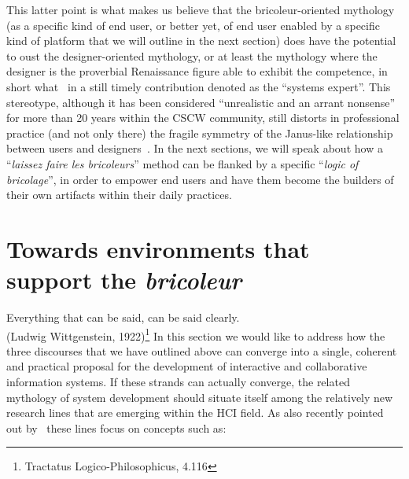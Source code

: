 \documentclass{article}
\let\origquotation\quotation
\let\endorigquotation\endquotation
\renewenvironment{quotation}{\vspace{-0.5\parskip}
  \origquotation
  \footnotesize
}{\endorigquotation}
\begin{document}
This latter point is what makes us believe that the bricoleur-oriented mythology (as a specific kind of end user, or better yet, of end user enabled by a specific kind of platform that we will outline in the next section) does have the potential to oust the designer-oriented mythology, or at least the mythology where the designer is the proverbial Renaissance figure able to exhibit the competence, in short what~\citet{hirschheim_four_1989} in a still timely contribution denoted as the ``systems expert''. This stereotype, although it has been considered ``unrealistic and an arrant nonsense'' for more than 20 years within the CSCW community, still distorts in professional practice (and not only there) the fragile symmetry of the Janus-like relationship between users and designers~\citep{bowers_janus_1991}. In the next sections, we will speak about how a ``\emph{laissez faire les bricoleurs}'' method can be flanked by a specific ``\emph{logic of bricolage}'', in order to empower end users and have them become the builders of their own artifacts within their daily practices. 










\section{Towards environments that support the \emph{bricoleur}}
\label{sec:environments}
\begin{quotation}
Everything that can be said, can be said clearly.\\
(Ludwig Wittgenstein, 1922)\footnote{Tractatus Logico-Philosophicus, 4.116}
\end{quotation}
In this section we would like to address how the three discourses that we have outlined above can converge into a single, coherent and practical proposal for the development of interactive and collaborative information systems. If these strands can actually converge, the related mythology of system development should situate itself among the relatively new research lines that are emerging within the HCI field. As also recently pointed out by~\citet{ardito_composition_2012} these lines focus on concepts such as:
\end{document}
